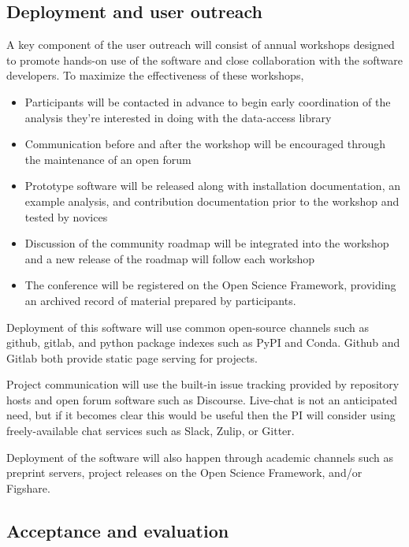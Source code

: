 \subsection{Deployment and user outreach}
A key component of the user outreach will consist of annual workshops designed to promote hands-on use of the software and close collaboration with the software developers.  To maximize the effectiveness of these workshops,

\begin{itemize}
    \item Participants will be contacted in advance to begin early coordination of the analysis they're interested in doing with the data-access library
    \item Communication before and after the workshop will be encouraged through the maintenance of an open forum
    \item Prototype software will be released along with installation documentation, an example analysis, and contribution documentation prior to the workshop and tested by novices
    \item Discussion of the community roadmap will be integrated into the workshop and a new release of the roadmap will follow each workshop
    \item The conference will be registered on the Open Science Framework, providing an archived record of material prepared by participants.
\end{itemize}

Deployment of this software will use common open-source channels such as github, gitlab, and python package indexes such as PyPI and Conda.  Github and Gitlab both provide static page serving for projects.

Project communication will use the built-in issue tracking provided by repository hosts and open forum software such as Discourse.  Live-chat is not an anticipated need, but if it becomes clear this would be useful then the PI will consider using freely-available chat services such as Slack, Zulip, or Gitter.

Deployment of the software will also happen through academic channels such as preprint servers, project releases on the Open Science Framework, and/or Figshare.



\subsection{Acceptance and evaluation}

